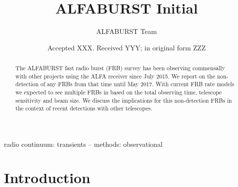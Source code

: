 \documentclass[a4paper,fleqn,usenatbib]{mnras}
\title[ALFABURST Initial]{ALFABURST Initial}
\author[ALFABURST Team]{
ALFABURST Team
}
\date{Accepted XXX. Received YYY; in original form ZZZ}
\begin{document}
\label{firstpage}
\pagerange{\pageref{firstpage}--\pageref{lastpage}}
\maketitle

\begin{abstract}
The ALFABURST fast radio burst (FRB) survey has been observing commensally with
other projects using the ALFA receiver since July 2015. We report on the
non-detection of any FRBs from that time until May 2017. With current FRB rate
models we expected to see multiple FRBs in based on the total observing time,
telescope sensitivity and beam size. We discuss the implications for this
non-detection FRBs in the context of recent detections with other telescopes.
\end{abstract}

\begin{keywords}
radio continuum: transients -- methods: observational
\end{keywords}





\section{Introduction}
\end{document}
